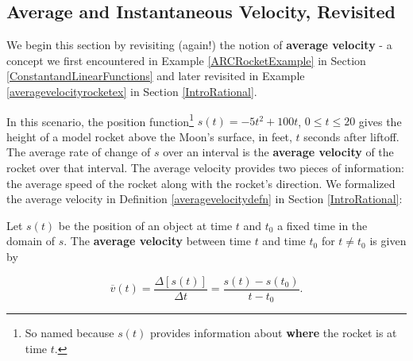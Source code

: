 \documentclass{ximera}
\begin{document}
	\author{Stitz-Zeager}




\setcounter{footnote}{0}

\label{IntroductiontoDerivatives}

\subsection{Average and Instantaneous Velocity, Revisited}
\label{avginstantvelocity}

We begin this section by revisiting (again!) the notion of \textbf{average velocity} - a concept we first encountered in  Example \ref{ARCRocketExample} in Section \ref{ConstantandLinearFunctions} and later revisited in Example \ref{averagevelocityrocketex} in Section \ref{IntroRational}. 


\medskip

In this scenario,  the position  function\footnote{So named because $s(t)$   provides information about \textbf{where} the rocket is at time $t$.} $s(t) = -5t^2+100t$, $0 \leq t \leq 20$ gives the height of a model rocket above the Moon's surface, in feet,  $t$ seconds after liftoff.  The average rate of change of $s$ over an interval is the \textbf{average velocity} of the rocket over that interval.  The average velocity provides two pieces of information:  the average speed of the rocket along with the rocket's direction.   We formalized the average velocity in Definition \ref{averagevelocitydefn} in Section \ref{IntroRational}:

\medskip


\begin{defnrecall} Let $s(t)$ be the position of an object at time $t$ and $t_{0}$  a fixed time in the domain of $s$.  The \textbf{average velocity} between time $t$ and time $t_{0}$  for $t \neq t_{0}$ is given by

\[ \overline{v}(t) = \dfrac{\Delta [s(t)]}{\Delta t} = \dfrac{s(t) - s(t_{0})}{t - t_{0}}. \]


\end{defnrecall}


\medskip
\end{document}
